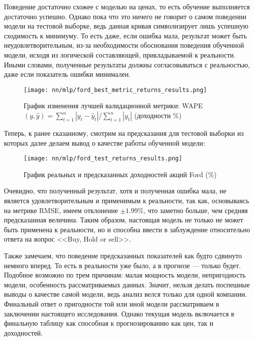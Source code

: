 Поведение достаточно схожее с моделью на ценах, то есть обучение выполняется достаточно успешно. Однако пока что это ничего не говорит о самом поведении модели на тестовой выборке, ведь данная кривая символизирует лишь успешную сходимость к минимуму. То есть даже, если ошибка мала, результат может быть неудовлетворительным, из-за необходимости обоснования поведения обученной модели, исходя из логической составляющей, прикладываемой к реальности. Иными словами, полученные результаты должны согласовываться с реальностью, даже если показатель ошибки минимален.
\begin{figure}[H]
	\centering
	\texttt{[image: nn/mlp/ford\_best\_metric\_returns\_results.png]}
	\caption{График изменения лучшей валидационной метрики: WAPE$(y, \hat{y}) = \sum_{t = 1}^n |y_t - \hat{y}_t| / \sum_{t = 1}^n |y_t|$ (доходности \%)}
	\label{fig::ford_best_metric_returns_results}
\end{figure}
Теперь, к ранее сказанному, смотрим на предсказания для тестовой выборки из которых далее делаем вывод о качестве работы обученной модели:
\begin{figure}[H]
	\centering
	\texttt{[image: nn/mlp/ford\_test\_returns\_results.png]}
	\caption{График реальных и предсказанных доходностей акций Ford (\%)}
	\label{fig::ford_test_returns_results}
\end{figure}
Очевидно, что полученный результат, хотя и полученная ошибка мала, не является удовлетворительным и применимым к реальности, так как, основываясь на метрике RMSE, имеем отклонение $\pm 1.99\%$, что заметно больше, чем средняя предсказанная величина. Таким образом, настоящая модель не только не может быть применена к реальности, но и способна ввести в заблуждение относительно ответа на вопрос <<Buy, Hold or sell>>. 

Также замечаем, что поведение предсказанных показателей как будто сдвинуто немного вперед. То есть в реальности уже было, а в прогнозе --- только будет. Подобное возможно по трем причинам: малая мощность модели, непригодность модели, особенность рассматриваемых данных. Значит, нельзя делать поспешные выводы о качестве самой модели, ведь анализ велся только для одной компании. Финальный ответ о пригодности той или иной модели рассматриваем в заключении настоящего исследования. Однако текущая модель включается в финальную таблицу как способная к прогнозированию как цен, так и доходностей.